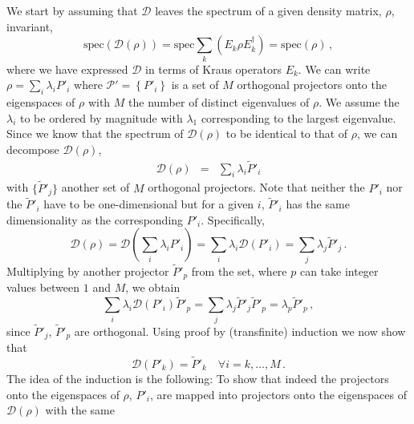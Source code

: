 We start by assuming that $\mathcal{D}$ leaves the
spectrum of a given density matrix, $\rho$, invariant,
\begin{equation*}
\text{spec}\left(\mathcal{D}\left(\rho\right)\right)=
\text{spec}\sum_{k}\left(E_{k}\rho E_{k}^{\dagger}\right)=
\text{spec}\left(\rho\right) \,,
\end{equation*}
where we have expressed $\mathcal{D}$ in terms of Kraus operators
$E_k$. We can write $\rho=\sum_{i}\lambda_{i}P'_{i}$ where
$\mathcal{P}'=\left\{P'_{i}\right\}$ is a set of $M$ orthogonal
projectors onto the eigenspaces of $\rho$ with $M$ the number of
distinct eigenvalues of $\rho$.
We assume the $\lambda_{i}$ to be ordered by magnitude
with $\lambda_{1}$ corresponding to the largest eigenvalue.
Since we know that the spectrum of $\mathcal{D}\left(\rho\right)$
to be identical to that of $\rho$, we can
decompose $\mathcal{D}\left(\rho\right)$,
\begin{eqnarray*}
\mathcal{D}\left(\rho\right) & = & \sum_{i}\lambda_{i}\tilde{P}'_{i}
\end{eqnarray*}
with $\{ \tilde{P}'_{j}\} $ another set of $M$ orthogonal
projectors.
Note that neither the $P'_{i}$ nor the $\tilde{P}'_{i}$
have to be one-dimensional but
for a given $i$, $\tilde{P}'_{i}$ has the same dimensionality
as the corresponding $P'_{i}$. Specifically,
\begin{equation*}
\mathcal{D}\left(\rho\right)=
\mathcal{D}\left(\sum_{i}\lambda_{i}P'_{i}\right)=
\sum_{i}\lambda_{i}\mathcal{D}\left(P'_{i}\right)=
\sum_{j}\lambda_{j}\tilde{P}'_{j} \,.
\end{equation*}
Multiplying by another projector $\tilde{P}'_{p}$ from the set,
where $p$ can take integer values between $1$ and $M$,
we obtain
\begin{equation}
\sum_{i}\lambda_{i}\mathcal{D}\left(P'_{i}\right)\tilde{P}'_{p}
=\sum_{j}\lambda_{j}\tilde{P}'_{j}\tilde{P}'_{p}
=\lambda_{p}\tilde{P}'_{p} \,, \label{eq:3st_app_startingequation}
\end{equation}
since $\tilde{P}'_{j}$, $\tilde{P}'_{p}$ are orthogonal.
Using proof by (transfinite) induction we now show that
\begin{equation*}
\mathcal{D}\left(P'_{k}\right)=\tilde{P}'_{k} \quad \forall i=k,\dots, M\,.
\end{equation*}
The idea of the induction is the following: To show that indeed the
projectors onto the eigenspaces of $\rho$, $P'_i$, are mapped into
projectors onto the eigenspaces of $\mathcal{D}(\rho)$ with the same

